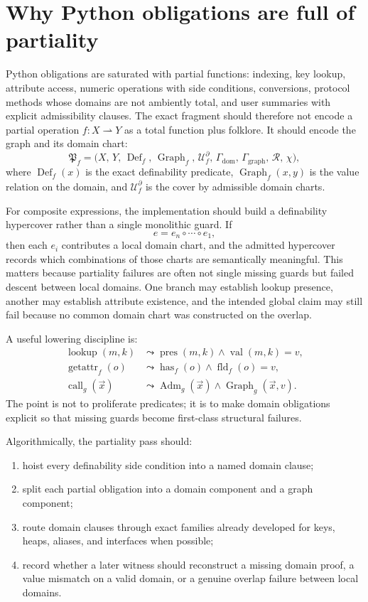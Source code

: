 \documentclass[11pt]{report}
\begin{document}
\section{Why Python obligations are full of partiality}
Python obligations are saturated with partial functions: indexing, key lookup, attribute access, numeric operations with side conditions, conversions, protocol methods whose domains are not ambiently total, and user summaries with explicit admissibility clauses. The exact fragment should therefore not encode a partial operation $f : X \rightharpoonup Y$ as a total function plus folklore. It should encode the graph and its domain chart:
\[
\mathfrak{P}_{f}
=
\bigl(
X,\,
Y,\,
\operatorname{Def}_{f},\,
\operatorname{Graph}_{f},\,
\mathcal{U}^{\partial}_{f},\,
\Gamma_{\mathrm{dom}},\,
\Gamma_{\mathrm{graph}},\,
\mathcal{R},\,
\chi
\bigr),
\]
where $\operatorname{Def}_{f}(x)$ is the exact definability predicate, $\operatorname{Graph}_{f}(x,y)$ is the value relation on the domain, and $\mathcal{U}^{\partial}_{f}$ is the cover by admissible domain charts.

For composite expressions, the implementation should build a definability hypercover rather than a single monolithic guard. If
\[
e = e_n \circ \cdots \circ e_1,
\]
then each $e_i$ contributes a local domain chart, and the admitted hypercover records which combinations of those charts are semantically meaningful. This matters because partiality failures are often not single missing guards but failed descent between local domains. One branch may establish lookup presence, another may establish attribute existence, and the intended global claim may still fail because no common domain chart was constructed on the overlap.

A useful lowering discipline is:
\begin{align*}
\operatorname{lookup}(m,k) &\leadsto \operatorname{pres}(m,k) \wedge \operatorname{val}(m,k)=v,\\
\operatorname{getattr}_f(o) &\leadsto \operatorname{has}_f(o) \wedge \operatorname{fld}_f(o)=v,\\
\operatorname{call}_g(\vec{x}) &\leadsto \operatorname{Adm}_g(\vec{x}) \wedge \operatorname{Graph}_g(\vec{x},v).
\end{align*}
The point is not to proliferate predicates; it is to make domain obligations explicit so that missing guards become first-class structural failures.

Algorithmically, the partiality pass should:
\begin{enumerate}
\item hoist every definability side condition into a named domain clause;
\item split each partial obligation into a domain component and a graph component;
\item route domain clauses through exact families already developed for keys, heaps, aliases, and interfaces when possible;
\item record whether a later witness should reconstruct a missing domain proof, a value mismatch on a valid domain, or a genuine overlap failure between local domains.
\end{enumerate}
\end{document}
